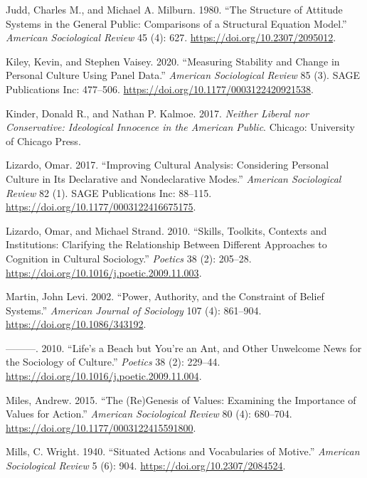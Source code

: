 \documentclass[12pt,]{article}
\begin{document}
\leavevmode\hypertarget{ref-judd1980}{}%
Judd, Charles M., and Michael A. Milburn. 1980. ``The Structure of Attitude Systems in the General Public: Comparisons of a Structural Equation Model.'' \emph{American Sociological Review} 45 (4): 627. \url{https://doi.org/10.2307/2095012}.

\leavevmode\hypertarget{ref-kiley2020}{}%
Kiley, Kevin, and Stephen Vaisey. 2020. ``Measuring Stability and Change in Personal Culture Using Panel Data.'' \emph{American Sociological Review} 85 (3). SAGE Publications Inc: 477--506. \url{https://doi.org/10.1177/0003122420921538}.

\leavevmode\hypertarget{ref-kinder2017}{}%
Kinder, Donald R., and Nathan P. Kalmoe. 2017. \emph{Neither Liberal nor Conservative: Ideological Innocence in the American Public}. Chicago: University of Chicago Press.

\leavevmode\hypertarget{ref-lizardo2017}{}%
Lizardo, Omar. 2017. ``Improving Cultural Analysis: Considering Personal Culture in Its Declarative and Nondeclarative Modes.'' \emph{American Sociological Review} 82 (1). SAGE Publications Inc: 88--115. \url{https://doi.org/10.1177/0003122416675175}.

\leavevmode\hypertarget{ref-lizardo2010a}{}%
Lizardo, Omar, and Michael Strand. 2010. ``Skills, Toolkits, Contexts and Institutions: Clarifying the Relationship Between Different Approaches to Cognition in Cultural Sociology.'' \emph{Poetics} 38 (2): 205--28. \url{https://doi.org/10.1016/j.poetic.2009.11.003}.

\leavevmode\hypertarget{ref-martin2002}{}%
Martin, John Levi. 2002. ``Power, Authority, and the Constraint of Belief Systems.'' \emph{American Journal of Sociology} 107 (4): 861--904. \url{https://doi.org/10.1086/343192}.

\leavevmode\hypertarget{ref-martin2010}{}%
---------. 2010. ``Life's a Beach but You're an Ant, and Other Unwelcome News for the Sociology of Culture.'' \emph{Poetics} 38 (2): 229--44. \url{https://doi.org/10.1016/j.poetic.2009.11.004}.

\leavevmode\hypertarget{ref-miles2015}{}%
Miles, Andrew. 2015. ``The (Re)Genesis of Values: Examining the Importance of Values for Action.'' \emph{American Sociological Review} 80 (4): 680--704. \url{https://doi.org/10.1177/0003122415591800}.

\leavevmode\hypertarget{ref-mills1940}{}%
Mills, C. Wright. 1940. ``Situated Actions and Vocabularies of Motive.'' \emph{American Sociological Review} 5 (6): 904. \url{https://doi.org/10.2307/2084524}.
\end{document}

